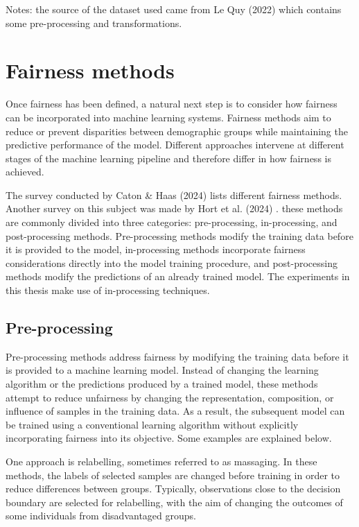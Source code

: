 Notes: the source of the dataset used came from Le Quy (2022) \cite{lequy} which contains some pre-processing and transformations.





\section{Fairness methods}
Once fairness has been defined, a natural next step is to consider how fairness can be incorporated into machine learning systems. Fairness methods aim to reduce or prevent disparities between demographic groups while maintaining the predictive performance of the model. Different approaches intervene at different stages of the machine learning pipeline and therefore differ in how fairness is achieved.

The survey conducted by Caton \& Haas (2024) \cite{fairmethod_caton} lists different fairness methods. Another survey on this subject was made by Hort et al. (2024) \cite{surveyHort}. these methods are commonly divided into three categories: pre-processing, in-processing, and post-processing methods. Pre-processing methods modify the training data before it is provided to the model, in-processing methods incorporate fairness considerations directly into the model training procedure, and post-processing methods modify the predictions of an already trained model. The experiments in this thesis make use of in-processing techniques.

\subsection{Pre-processing}
Pre-processing methods address fairness by modifying the training data before it is provided to a machine learning model. Instead of changing the learning algorithm or the predictions produced by a trained model, these methods attempt to reduce unfairness by changing the representation, composition, or influence of samples in the training data. As a result, the subsequent model can be trained using a conventional learning algorithm without explicitly incorporating fairness into its objective. Some examples are explained below.

One approach is relabelling, sometimes referred to as massaging. In these methods, the labels of selected samples are changed before training in order to reduce differences between groups. Typically, observations close to the decision boundary are selected for relabelling, with the aim of changing the outcomes of some individuals from disadvantaged groups.

